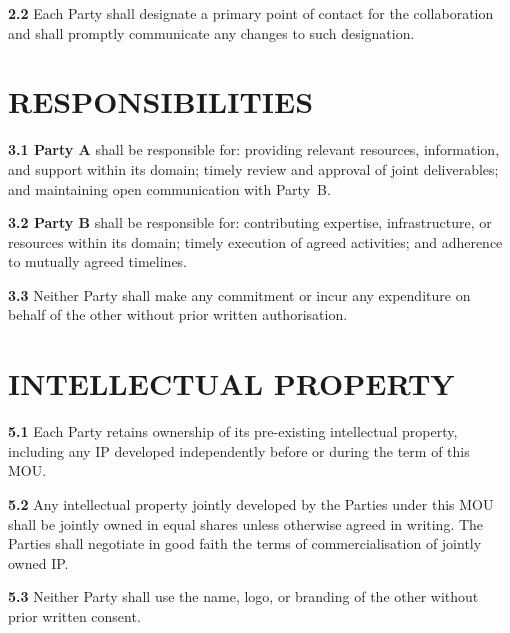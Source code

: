 \documentclass[10pt]{article}
\begin{document}
\textbf{2.2} Each Party shall designate a primary point of contact for the collaboration and shall promptly communicate any changes to such designation.

\section{RESPONSIBILITIES}

\textbf{3.1 Party A} shall be responsible for: providing relevant resources, information, and support within its domain; timely review and approval of joint deliverables; and maintaining open communication with Party~B.

\textbf{3.2 Party B} shall be responsible for: contributing expertise, infrastructure, or resources within its domain; timely execution of agreed activities; and adherence to mutually agreed timelines.

\textbf{3.3} Neither Party shall make any commitment or incur any expenditure on behalf of the other without prior written authorisation.


\section{INTELLECTUAL PROPERTY}

\textbf{5.1} Each Party retains ownership of its pre-existing intellectual property, including any IP developed independently before or during the term of this MOU.

\textbf{5.2} Any intellectual property jointly developed by the Parties under this MOU shall be jointly owned in equal shares unless otherwise agreed in writing. The Parties shall negotiate in good faith the terms of commercialisation of jointly owned IP.

\textbf{5.3} Neither Party shall use the name, logo, or branding of the other without prior written consent.
\end{document}
